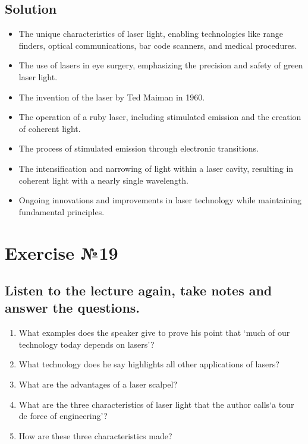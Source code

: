 \subsection*{Solution}
\begin{itemize}
      \item The unique characteristics of laser light, enabling technologies like range
            finders, optical communications, bar code scanners, and medical procedures.
      \item The use of lasers in eye surgery, emphasizing the precision and safety of
            green laser light.
      \item The invention of the laser by Ted Maiman in 1960.
      \item The operation of a ruby laser, including stimulated emission and the
            creation of coherent light.
      \item The process of stimulated emission through electronic transitions.
      \item The intensification and narrowing of light within a laser cavity,
            resulting in coherent light with a nearly single wavelength.
      \item Ongoing innovations and improvements in laser technology while maintaining
            fundamental principles.
\end{itemize}

\section{Exercise №19}
\subsection*{Listen to the lecture again, take notes and answer the questions.}

\begin{enumerate}
      \item What examples does the speaker give to prove his point that ‘much of our
            technology today depends on lasers’?
      \item What technology does he say highlights all other applications of lasers?
      \item What are the advantages of a laser scalpel?
      \item What are the three characteristics of laser light that the author calls‘a
            tour de force of engineering’?
      \item How are these three characteristics made?
\end{enumerate}

